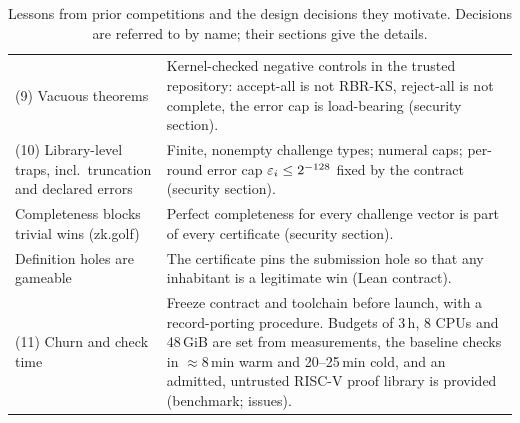 \begin{table}[tp]
\begin{tabularx}{\linewidth}{@{}>{\raggedright\arraybackslash}p{5.4cm}>{\raggedright\arraybackslash}X@{}}
(9) Vacuous theorems & Kernel-checked negative controls in the trusted
  repository: accept-all is not RBR-KS, reject-all is not complete, the error cap is load-bearing
  (security section). \\
(10) Library-level traps, incl.\ truncation and declared errors & Finite, nonempty challenge types;
  numeral caps; per-round error cap $\varepsilon_i\le2^{-128}$ fixed by the contract (security section). \\
Completeness blocks trivial wins (zk.golf) & Perfect completeness for every challenge vector is
  part of every certificate (security section). \\
Definition holes are gameable & The certificate pins the submission hole so that any inhabitant
  is a legitimate win (Lean contract). \\
(11) Churn and check time & Freeze contract and toolchain before launch, with a record-porting
  procedure. Budgets of 3\,h, 8 CPUs and 48\,GiB are set from measurements, the baseline checks in
  $\approx8$\,min warm and 20--25\,min cold, and an admitted, untrusted RISC-V proof library is provided (benchmark; issues). \\
\bottomrule
\end{tabularx}
\caption{Lessons from prior competitions and the design decisions they motivate. Decisions are
referred to by name; their sections give the details.}
\label{tab:prior-lessons}
\end{table}

